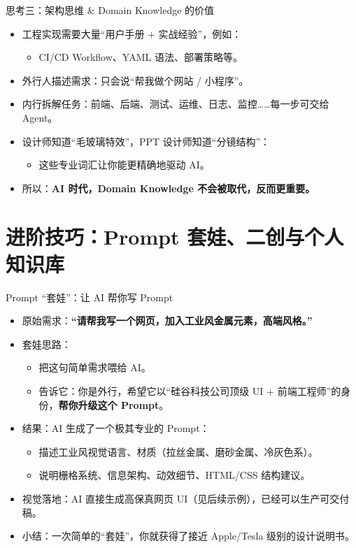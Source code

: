 \documentclass[10pt,aspectratio=169]{beamer}
\begin{document}
\begin{frame}{思考三：架构思维 \& Domain Knowledge 的价值}
  \begin{itemize}
    \item 工程实现需要大量“用户手册 + 实战经验”，例如：
      \begin{itemize}
        \item CI/CD Workflow、YAML 语法、部署策略等。
      \end{itemize}
    \item 外行人描述需求：只会说“帮我做个网站 / 小程序”。
    \item 内行拆解任务：前端、后端、测试、运维、日志、监控……每一步可交给 Agent。
    \item 设计师知道“毛玻璃特效”，PPT 设计师知道“分镜结构”：
      \begin{itemize}
        \item 这些专业词汇让你能更精确地驱动 AI。
      \end{itemize}
    \item 所以：\textbf{AI 时代，Domain Knowledge 不会被取代，反而更重要。}
  \end{itemize}
\end{frame}

\section{进阶技巧：Prompt 套娃、二创与个人知识库}

\begin{frame}{Prompt “套娃”：让 AI 帮你写 Prompt}
  \begin{itemize}
    \item 原始需求：\textbf{“请帮我写一个网页，加入工业风金属元素，高端风格。”}
    \item 套娃思路：
      \begin{itemize}
        \item 把这句简单需求喂给 AI。
        \item 告诉它：你是外行，希望它以“硅谷科技公司顶级 UI + 前端工程师”的身份，\textbf{帮你升级这个 Prompt}。
      \end{itemize}
    \item 结果：AI 生成了一个极其专业的 Prompt：
      \begin{itemize}
        \item 描述工业风视觉语言、材质（拉丝金属、磨砂金属、冷灰色系）。
        \item 说明栅格系统、信息架构、动效细节、HTML/CSS 结构建议。
      \end{itemize}
    \item 视觉落地：AI 直接生成高保真网页 UI（见后续示例），已经可以生产可交付稿。
    \item 小结：一次简单的“套娃”，你就获得了接近 Apple/Tesla 级别的设计说明书。
  \end{itemize}
\end{frame}
\end{document}
